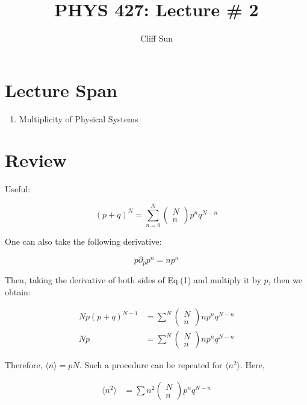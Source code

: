 \documentclass{article}
\title{PHYS 427: Lecture \# 2}
\author{Cliff Sun}
\newtheorem{one minute paper}[theorem]{One Minute Paper}
\begin{document}
\maketitle

\section*{Lecture Span}
\begin{enumerate}
    \item Multiplicity of Physical Systems
\end{enumerate}

\section*{Review}

Useful: 

\begin{equation}
    (p + q)^N = \sum^N_{n=0}\begin{pmatrix}
        N \\
        n
    \end{pmatrix}p^nq^{N-n}
\end{equation}

One can also take the following derivative:

\begin{equation}
    p\partial_p p^{n} = n p^n
\end{equation}

Then, taking the derivative of both sides of Eq.(1) and multiply it by $p$, then we obtain:

\begin{align}
    Np(p + q)^{N-1} &= \sum^{N}\begin{pmatrix}
        N \\
        n
    \end{pmatrix}np^n q^{N -n}\\
    Np &= \sum^{N}\begin{pmatrix}
        N \\
        n
    \end{pmatrix}np^n q^{N -n}
\end{align}

Therefore, $\langle n \rangle = pN$. Such a procedure can be repeated for $\langle n^2 \rangle$. Here, 

\begin{align}
    \langle n^2 \rangle &= \sum n^2 \begin{pmatrix}
        N \\
        n
    \end{pmatrix}p^n q^{N-n}
\end{align}
\end{document}
